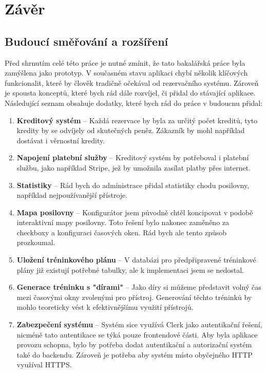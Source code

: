 \chapter{Závěr} \label{conclusion}

\section{Budoucí směřování a rozšíření}

Před shrnutím celé této práce je nutné zmínit, že tato bakalářská práce byla zamýšlena jako prototyp. V současném stavu aplikaci chybí několik klíčových funkcionalit, které by člověk tradičně očekával od rezervačního systému. Zároveň je spousta konceptů, které bych rád dále rozvíjel, či přidal do stávající aplikace. Následující seznam obsahuje dodatky, které bych rád do práce v budoucnu přidal:

\begin{enumerate}
    \item \textbf{Kreditový systém} – Každá rezervace by byla za určitý počet kreditů, tyto kredity by se odvíjely od skutečných peněz. Zákazník by mohl například dostávat i věrnostní kredity.
    \item \textbf{Napojení platební služby} – Kreditový systém by potřeboval i platební službu, jako například Stripe, jež by umožnila zasílat platby přes internet.
    \item \textbf{Statistiky} – Rád bych do administrace přidal statistiky chodu posilovny, například nejpoužívanější přístroje.
    \item \textbf{Mapa posilovny} – Konfigurátor jsem původně chtěl koncipovat v podobě interaktivní mapy posilovny. Toto řešení bylo nakonec zaměněno za checkboxy a konfiguraci časových oken. Rád bych ale tento způsob prozkoumal.
    \item \textbf{Uložení tréninkového plánu} – V databázi pro předpřipravené tréninkové plány již existují potřebné tabulky, ale k implementaci jsem se nedostal.
    \item \textbf{Generace tréninku s "dírami"} – Jako díry si můžeme představit volný čas mezi časovými okny zvolenými pro přístroj. Generování těchto tréninků by mohlo teoreticky vést k efektivnějšímu využití přístrojů.
    \item \textbf{Zabezpečení systému} – Systém sice využívá Clerk jako autentikační řešení, nicméně tato autentikace se týká pouze frontendové části. Aby byla aplikace provozu schopna, bylo by potřeba dodat autentikační a autorizační systém také do backendu. Zároveň je potřeba aby systém místo obyčejného HTTP využíval HTTPS.
\end{enumerate}

